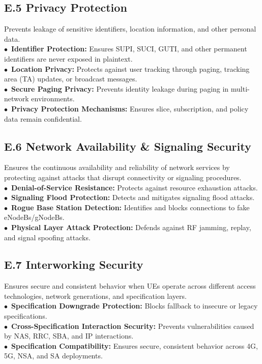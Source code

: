 \subsection*{E.5 Privacy Protection}
Prevents leakage of sensitive identifiers, location information, and other personal data.\\
\noindent$\bullet$~\textbf{Identifier Protection:} Ensures SUPI, SUCI, GUTI, and other permanent identifiers are never exposed in plaintext.  \\
\noindent$\bullet$~\textbf{Location Privacy:} Protects against user tracking through paging, tracking area (TA) updates, or broadcast messages.  \\
\noindent$\bullet$~\textbf{Secure Paging Privacy:} Prevents identity leakage during paging in multi-network environments.  \\
\noindent$\bullet$~\textbf{Privacy Protection Mechanisms:} Ensures slice, subscription, and policy data remain confidential.  

\subsection*{E.6 Network Availability \& Signaling Security}
Ensures the continuous availability and reliability of network services by protecting against attacks that disrupt connectivity or signaling procedures. \\
\noindent$\bullet$~\textbf{Denial-of-Service Resistance:} Protects against resource exhaustion attacks.\\
\noindent$\bullet$~\textbf{Signaling Flood Protection:} Detects and mitigates signaling flood attacks.\\
\noindent$\bullet$~\textbf{Rogue Base Station Detection:} Identifies and blocks connections to fake eNodeBs/gNodeBs.\\
\noindent$\bullet$~\textbf{Physical Layer Attack Protection:} Defends against RF jamming, replay, and signal spoofing attacks.






\subsection*{E.7 Interworking Security}
Ensures secure and consistent behavior when UEs operate across different access technologies, network generations, and specification layers. \\
\noindent$\bullet$~\textbf{Specification Downgrade Protection:} Blocks fallback to insecure or legacy specifications.\\
\noindent$\bullet$~\textbf{Cross-Specification Interaction Security:} Prevents vulnerabilities caused by NAS, RRC, SBA, and IP interactions.\\
\noindent$\bullet$~\textbf{Specification Compatibility:} Ensures secure, consistent behavior across 4G, 5G, NSA, and SA deployments.



